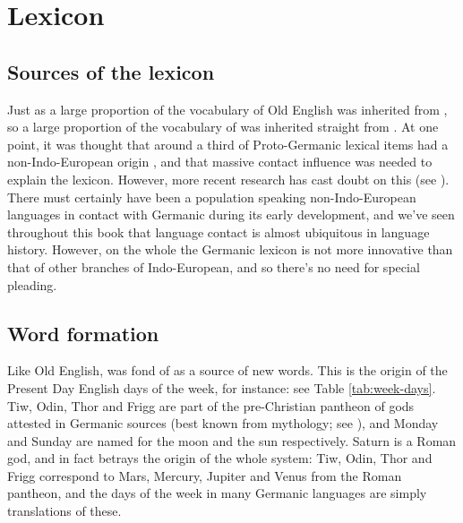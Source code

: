 \section{Lexicon}
\subsection{Sources of the lexicon}
Just as a large proportion of the vocabulary of Old English was inherited from , so a large proportion of the vocabulary of  was inherited straight from . At one point, it was thought that around a third of Proto-Germanic lexical items had a non-Indo-European origin \citep[88]{Feist1924}, and that massive contact influence was needed to explain the  lexicon. However, more recent research has cast doubt on this (see \citealp[407--409]{Roberge2010}). There must certainly have been a population speaking non-Indo-European languages in contact with Germanic during its early development, and we've seen throughout this book that language contact is almost ubiquitous in language history. However, on the whole the Germanic lexicon is not more innovative than that of other branches of Indo-European, and so there's no need for special pleading.

\subsection{Word formation}
Like Old English,  was fond of  as a source of new words. This is the origin of the Present Day English days of the week, for instance: see Table \ref{tab:week-days}. Tiw, Odin, Thor and Frigg are part of the pre-Christian pantheon of gods attested in Germanic sources (best known from  mythology; see \citealp{Gaiman2017}), and Monday and Sunday are named for the moon and the sun respectively. Saturn is a Roman god, and in fact betrays the origin of the whole system: Tiw, Odin, Thor and Frigg correspond to Mars, Mercury, Jupiter and Venus from the Roman pantheon, and the days of the week in many Germanic languages are simply translations of these.

